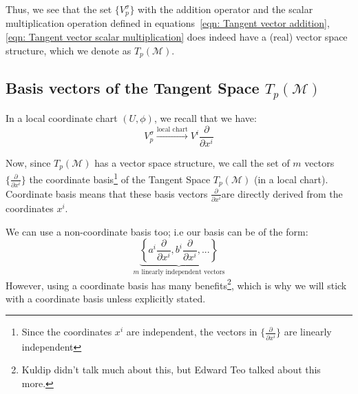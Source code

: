       Thus, we see that the set $\{V_p^\sigma\}$ with the addition operator
      and the scalar multiplication operation defined in
      equations~\ref{eqn: Tangent vector addition}, \ref{eqn: Tangent vector
      scalar multiplication} does indeed have a (real) vector space
      structure, which we denote as $T_p(\mathcal{M})$.

    \subsection{Basis vectors of the Tangent Space $T_p(\mathcal{M})$}
      In a local coordinate chart $(U,\phi)$, we recall that we have:
      \[V^\sigma_p \xrightarrow{\text{local chart}} V^i
      \frac{\partial}{\partial x^i} \] 
      
      Now, since $T_p(\mathcal{M})$ has a vector space structure, we call
      the set of $m$ vectors $\{\frac{\partial}{\partial x^i}\}$ the
      coordinate basis\footnote{Since the coordinates $x^i$ are
      independent, the vectors in $\{\frac{\partial}{\partial x^i}\}$ are
      linearly independent} of the Tangent Space $T_p(\mathcal{M})$ (in a
      local chart). Coordinate basis means that these basis vectors
      $\frac{\partial}{\partial x^i}$are directly derived from the
      coordinates $x^i$.

      We can use a non-coordinate basis too; i.e our basis can be of the
      form:
      \[
        \underbrace{\left\{a^i\frac{\partial}{\partial x^i}, b^i\frac{\partial}{\partial
      x^i},... \right\}}_{m \text{ linearly independent vectors}}
      \]
      However, using a coordinate basis has many benefits\footnote{Kuldip
      didn't talk much about this, but Edward Teo talked about this
      more.}, which is why we will stick with a coordinate basis unless
      explicitly stated.
